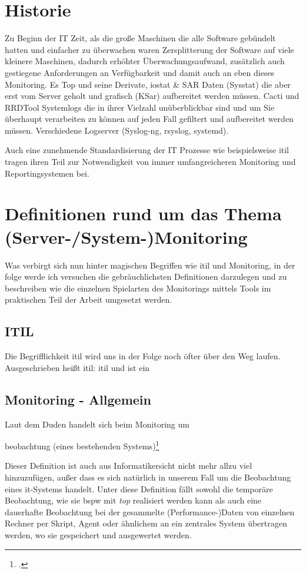 \documentclass[12pt,a4paper,parskip]{scrreprt}
\begin{document}
	\section{Historie}
	Zu Beginn der IT Zeit, als die 
	große Maschinen die alle Software gebündelt hatten und einfacher zu überwachen waren
	Zersplitterung der Software auf viele kleinere Maschinen, dadurch erhöhter Überwachungsaufwand, zusätzlich auch gestiegene Anforderungen an Verfügbarkeit und damit auch an eben dieses Monitoring.
	Es 
	Top und seine Derivate, iostat \& SAR Daten (Sysstat) die aber erst vom Server geholt und grafisch (KSar) aufbereitet werden müssen.
	Cacti und RRDTool
	Systemlogs die in ihrer Vielzahl unüberblickbar sind und um Sie überhaupt verarbeiten zu können auf jeden Fall gefiltert und aufbereitet werden müssen. Verschiedene Logserver (Syslog-ng, rsyslog, systemd).
	
	Auch eine zunehmende Standardisierung der IT Prozesse wie beispielsweise \acrfull{itil} tragen ihren Teil zur Notwendigkeit von immer umfangreicheren Monitoring und Reportingsystemen bei.
	
	\section{Definitionen rund um das Thema (Server-/System-)Monitoring}
	Was verbirgt sich nun hinter magischen Begriffen wie \gls{itil} und Monitoring, in der folge werde ich versuchen die gebräuchlichsten Definitionen darzulegen und zu beschreiben wie die einzelnen Spielarten des Monitorings mittels Tools im praktischen Teil der Arbeit umgesetzt werden.
	\subsection{ITIL}
	Die Begrifflichkeit \acrshort{itil} wird uns in der Folge noch öfter über den Weg laufen. Ausgeschrieben heißt \acrshort{itil}: \acrlong{itil} und ist ein 
	\subsection{Monitoring - Allgemein}
	Laut dem Duden handelt sich beim Monitoring um
	\begin{center}
		\glqq[Dauer]beobachtung (eines bestehenden Systems)\grqq\footcite[S. 701; Stichwort Monitoring]{duden}
	\end{center}
	Dieser Definition ist auch aus Informatikersicht nicht mehr allzu viel hinzuzufügen, außer dass es sich natürlich in unserem Fall um die Beobachtung eines \acrshort{it}-Systems handelt. Unter diese Definition fällt sowohl die temporäre Beobachtung, wie sie \acrlong{bspw} mit \textit{top} realisiert werden kann als auch eine dauerhafte Beobachtung bei der gesammelte (Performance-)Daten von einzelnen Rechner per Skript, Agent oder ähnlichem an ein zentrales System übertragen werden, wo sie gespeichert und ausgewertet werden.
	
\end{document}
